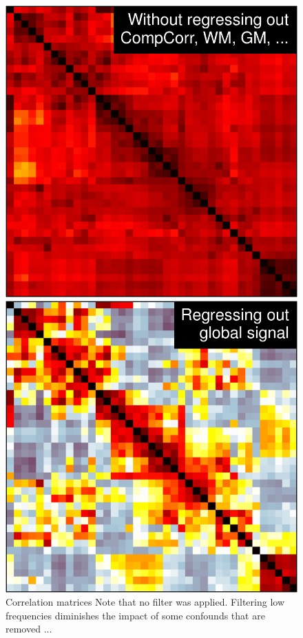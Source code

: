 \documentclass[5p]{elsarticle}
\begin{document}
\begin{figure}
\begin{minipage}{.32\linewidth}
    \includegraphics[width=\linewidth]{group_emp_cov_no_confounds.pdf}%

    \includegraphics[width=\linewidth]{group_emp_cov_global_mean.pdf}%
\end{minipage}%

\caption{
Correlation matrices
Note that no filter was applied. Filtering low frequencies diminishes the
impact of some confounds that are removed ...
}
\end{figure}
\end{document}
